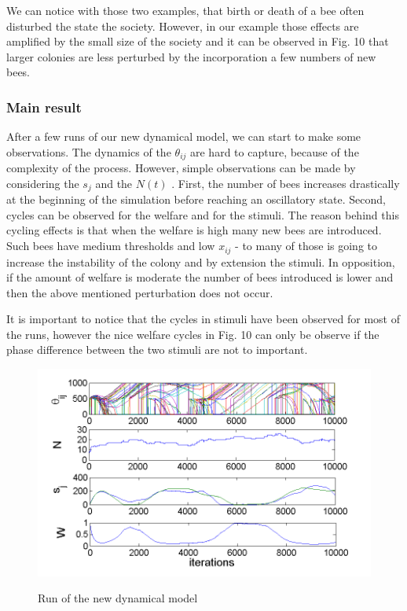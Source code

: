 We can notice with those two examples, that birth or death of a bee
often disturbed the state the society. However, in our example those effects are amplified
by the small size of the society and it can be observed in Fig. 10
 that larger colonies are less perturbed by the incorporation a few numbers of
new bees.


\subsubsection{Main result}

After a few runs of our new dynamical model, we can start to make some observations. The dynamics of the $\theta_{ij}$ are hard to capture,
because of the complexity of the process. However, simple observations
can be made by considering the $s_{j}$ and the $N(t)$ . First, the
number of bees increases drastically at the beginning of the simulation
before reaching an oscillatory state. Second, cycles can be observed
for the welfare and for the stimuli. The reason behind this cycling effects is that when
the welfare is high many new bees are introduced. Such bees have medium
thresholds and low $x_{ij}$ - to many of those is going to increase the instability of the colony and by extension the stimuli. In opposition,
if the amount of welfare is moderate the number of bees introduced is lower and then
the above mentioned perturbation does not occur.

It is important to notice that the cycles in stimuli have been
observed for most of the runs, however the nice welfare cycles in Fig. 10 can
only be observe if the phase difference between the two stimuli are not
to important.

\begin{figure}[ht!]
\begin{centering}
\includegraphics[scale=0.8]{figures/Figure6}
\label{fig:figure8}
\par\end{centering}

\begin{centering}
\caption{Run of the new dynamical model}

\par\end{centering}

\end{figure}



